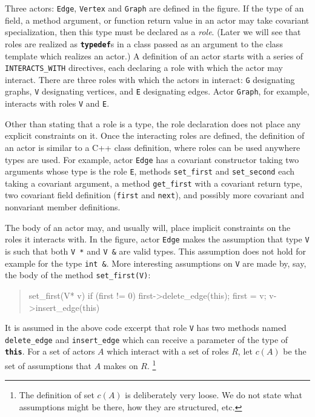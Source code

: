 \documentclass[11pt]{article}
\numberwithin{figure}{section}
\newcommand\CC{\Lang{\mbox{C++}}\xspace}
\newcommand\Lang[1]{\textsc{#1}}
\newcommand{\kw}[1]{\texttt{\textbf{#1}}}
\newcommand{\cd}[1]{\texttt{#1}}
\begin{document}
Three actors: \cd{Edge}, \cd{Vertex} and \cd{Graph}
    are defined in the figure.
If the type of an field, a method argument, or function return value
    in an actor may take covariant specialization, then
    this type must be declared as a \emph{role}.
(Later we will see that roles are realized as
    \kw{typedef}s in a class passed as an argument to the
    class template which realizes an actor.)
A definition of an actor starts with a series of
    \cd{INTERACTS\_WITH} directives,
    each declaring a role with which the actor may interact.
There are three roles with which the actors in  interact:
    \cd{G} designating graphs, \cd{V} designating vertices,
    and \cd{E} designating edges.
Actor \cd{Graph}, for example, interacts
    with roles \cd{V} and \cd{E}.

Other than stating that a role is a type,
    the role declaration does not place any explicit
    constraints on it.
Once the interacting roles are defined,
    the definition of an actor is similar
    to a \CC class definition, where roles can
    be used anywhere types are used.
For example, actor \cd{Edge} has a covariant constructor taking two arguments
    whose type is the role \cd{E}, methods \cd{set\_first} and \cd{set\_second}
    each taking a covariant argument, a method \cd{get\_first} with
    a covariant return type, two covariant field definition (\cd{first}
    and \cd{next}), and possibly more covariant and nonvariant member definitions.

The body of an actor may, and usually will, place
    implicit constraints  on the roles it interacts with.
In the figure, actor \cd{Edge} makes the
    assumption that type \cd{V} is such that
    both \cd{V *} and \cd{V \&} are valid types.
This assumption does not hold for example for the
    type \cd{int \&}.
More interesting assumptions on \cd{V} are made by, say,  the body of the method
    \cd{set\_first(V)}:
\begin{quote}
\begin{minipage}{\textwidth}
\CPP
    set_first(V* v)
    {
        if (first != 0)
            first->delete_edge(this);
        first = v;
        v->insert_edge(this)
    }
\END\PROGc{}
\end{minipage}
\end{quote}
It is assumed in the above code excerpt that
    role \cd{V} has two methods named \cd{delete\_edge}
    and \cd{insert\_edge}
    which can receive a parameter of the type of \kw{this}.
For a set of actors $A$ which interact with a set of roles $R$,
    let $c(A)$ be the set of assumptions that $A$ makes on $R$.%
\footnote{
    The definition of set $c(A)$ is deliberately very loose.
We do not state what assumptions might be there,
    how they are structured, etc.}
\end{document}
